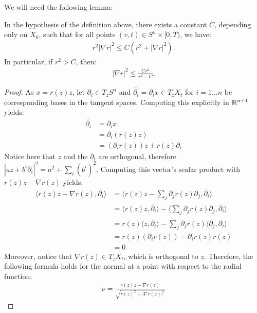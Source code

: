 We will need the following lemma: 

\begin{lemma}
	In the hypothesis of the definition above, there exists a constant $ C $, depending only on $ X_0 $, such that for all points $ (v, t) \in S^n \times [0, T) $, we have:
	\begin{align*}
		r^2 |\nabla r|^2 \leq C (r^2 + |\nabla r|^2).
	\end{align*}
	In particular, if $ r^2 > C $, then:
	\begin{align*}
		|\nabla r|^2 \leq \frac{C r^2}{r^2 - C}.
	\end{align*}
\end{lemma}


\begin{proof}
	As $ x = r(z) z $, let $\partial_i\in T_zS^n$ and $\overline{\partial_i}=\partial_i x \in T_zX_t$ for $i=1 \dots n$ be corresponding bases in the tangent spaces. Computing this explicitly in $\mathbb{R}^{n+1}$ yields:
	\begin{align*}
		\overline{\partial_i} &= \partial_i x\\
		&=\partial_i (r(z) z)\\ 
		&= (\partial_i r(z))z + r(z)\partial_i 
	\end{align*}
	Notice here that $z$ and the $\partial_i$ are orthogonal, therefore $|az+b^i\partial_i|^2 = a^2+\sum_i (b^i)^2$. 
	Computing this vector's scalar product with $r(z) z - \nabla r(z)$ yields: 
	\begin{align*}
		\langle  r(z) z - \nabla r(z), \overline{\partial_i} \rangle&= 
		\langle  r(z) z - \sum_j\partial_j r(z) \partial_j, \overline{\partial_i} \rangle\\&= 
		\langle  r(z) z, \overline{\partial_i} \rangle -
		\langle  \sum_j\partial_j r(z) \partial_j, \overline{\partial_i} \rangle\\
		 &=  r(z) \langle z , \overline{\partial_i} \rangle - \sum_j \partial_j r(z) \langle  \partial_j, \overline{\partial_i} \rangle\\
		&=   r(z)(\partial_i r(z)) - \partial_i r(z)r(z) 
		\\&= 0
	\end{align*}
	Moreover, notice that $\nabla r(z)\in T_zX_t$, which is orthogonal to $z$. 
	Therefore, the following formula holds for the normal at a point with respect to the radial function: 
	\begin{align*}
		\nu = \frac{ r(z) z - \nabla r(z) }{\sqrt{r(z)^2  + |\nabla r(z)|^2}}
	\end{align*}

\end{proof}
